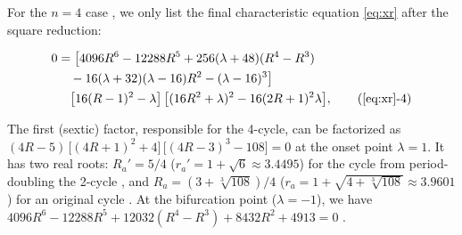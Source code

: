 \documentclass{ws-ijbc}
\begin{document}
For the $n = 4$ case
\cite{brown1, stephenson1, stephenson3, bailey1, bailey2, kk1, lewis},
%
we only list the final characteristic equation \eqref{eq:xr}
after the square reduction:%
%
\begin{small}
\begin{align}
0
& =
    \big[
    4096 R^6-12288 R^5 + 256 (\lambda + 48) (R^4- R^3) \notag \\
& \quad
    -16 (\lambda + 32)(\lambda - 16) R^2
      -(\lambda - 16)^3 \big] \notag \\
& \quad
    \big[ 16 (R-1)^2 - \lambda \big]
 \, \big[(16 R^2 + \lambda)^2 - 16 (2R+1)^2 \lambda \big],
  \tag{\ref{eq:xr}-4}
\label{eq:xr4}
\end{align}
\end{small}
%
%
%
The first (sextic) factor, responsible for the 4-cycle,
can be factorized as
$ (
    4R - 5
  )
\, \big[
  (4R + 1)^2 + 4
  \big]
\, \big[
  (4R - 3)^3 - 108
  \big] =0$
at the onset point $\lambda = 1$.
%
%
%
It has two real roots:
$R_a' = 5/4$
\big($r_a' = 1+\sqrt{6} \approx 3.4495$\big)
for the cycle from period-doubling the 2-cycle
  ,
and
$R_a = (3+\sqrt[3]{108})/4$
\big($r_a = 1+\sqrt{4+\sqrt[3]{108}} \approx 3.9601$\big)
for an original cycle .
%
At the bifurcation point ($\lambda = -1$), we have
$4096 R^6 - 12288 R^5 + 12032 (R^4 - R^3)
  + 8432 R^2 + 4913 = 0$
\cite{stephenson1, stephenson3, bailey2, kk1, lewis}.
%
%
\end{document}
